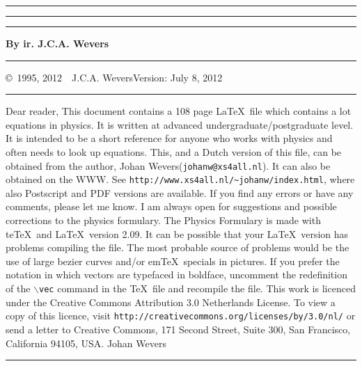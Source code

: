\documentclass[a4paper]{report}
\makeatletter
\newlength{\@x}
\makeatother
\begin{document}
\thispagestyle{empty}
\setcounter{page}{0}
\hrule
\rule{.4pt}{22.85cm}\hspace*{154mm}\rule{.4pt}{22.85cm}
\vspace*{-18cm}
\begin{center}
\Huge
{}
\end{center}
\vspace{2cm}
\centerline{\Large\bf By ir. J.C.A. Wevers}
\vspace*{2cm}
\vfill
\hrule
\newpage
\thispagestyle{empty}
\copyright~1995, 2012~~J.C.A. Wevers\hfill Version: July 8, 2012
\npar
\hrule
\par
\bigskip
Dear reader,
\npar
This document contains a 108 page \LaTeX\ file which contains a lot equations
in physics. It is written at advanced undergraduate/postgraduate level. It is
intended to be a short reference for anyone who works with physics and often
needs to look up equations.
\npar
This, and a Dutch version of this file, can be obtained from the author,
Johan Wevers\linebreak ({\tt johanw@xs4all.nl}).
\npar
It can also be obtained on the WWW. See
{\tt http://www.xs4all.nl/\~{}johanw/index.html}, where also Postscript
and PDF versions are available.
\npar
If you find any errors or have any comments, please let me know. I am always
open for suggestions and possible corrections to the physics formulary.
\npar
The Physics Formulary is made with te\TeX\ and \LaTeX\ version 2.09. It can
be possible that your \LaTeX\ version has problems compiling the file. The
most probable source of problems would be the use of large bezier curves
and/or em\TeX\ specials in pictures. If you prefer the notation in which
vectors are typefaced in boldface, uncomment the redefinition of the
{\tt $\backslash$vec} command in the \TeX\ file and recompile the file.
\npar
This work is licenced under the Creative Commons Attribution 3.0 Netherlands License.
To view a copy of this licence, visit {\tt http://creativecommons.org/licenses/by/3.0/nl/} or send
a letter to Creative Commons, 171 Second Street, Suite 300, San Francisco, California 94105, USA.
\npar
Johan Wevers
\vfill
\hrule
\newpage

\tableofcontents
\newpage

\end{document}

